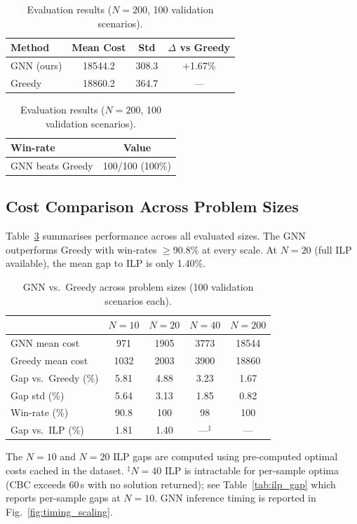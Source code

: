 \documentclass[conference]{IEEEtran}
\begin{document}
\begin{table}[htbp]
\caption{Evaluation results ($N{=}200$, 100 validation scenarios).}
\label{tab:results_200obj}
\centering
\begin{tabular}{@{}lccc@{}}
\toprule
\textbf{Method} & \textbf{Mean Cost} & \textbf{Std} & \textbf{$\Delta$ vs Greedy} \\
\midrule
GNN (ours) & 18544.2 & 308.3 & +1.67\% \\
Greedy & 18860.2 & 364.7 & \multicolumn{1}{c}{---} \\
\bottomrule
\end{tabular}

\vspace{2mm}
\begin{tabular}{@{}lc@{}}
\toprule
\textbf{Win-rate} & \textbf{Value} \\
\midrule
GNN beats Greedy & 100/100 (100\%) \\
\bottomrule
\end{tabular}
\end{table}

\subsection{Cost Comparison Across Problem Sizes}

Table~\ref{tab:cross_size} summarises performance across all evaluated sizes. The GNN outperforms Greedy with win-rates $\geq$90.8\% at every scale. At $N{=}20$ (full ILP available), the mean gap to ILP is only 1.40\%.

\begin{table}[htbp]
\caption{GNN vs.\ Greedy across problem sizes (100 validation scenarios each).}
\label{tab:cross_size}
\centering
\begin{tabular}{@{}lcccc@{}}
\toprule
& $N{=}10$ & $N{=}20$ & $N{=}40$ & $N{=}200$ \\ 
\midrule
GNN mean cost        & 971   & 1905  & 3773  & 18544 \\
Greedy mean cost     & 1032  & 2003  & 3900  & 18860 \\
Gap vs.\ Greedy (\%)     & 5.81  & 4.88  & 3.23  & 1.67 \\
Gap std (\%)         & 5.64  & 3.13  & 1.85  & 0.82 \\
Win-rate (\%)        & 90.8    & 100   & 98    & 100 \\
Gap vs.\ ILP (\%)   & 1.81  & 1.40  & ---$^{\ddag}$ & --- \\
\bottomrule
\end{tabular}
\vspace{1mm}

\footnotesize The $N{=}10$ and $N{=}20$ ILP gaps are computed using pre-computed optimal costs cached in the dataset. $^{\ddag}$$N{=}40$ ILP is intractable for per-sample optima (CBC exceeds 60\,s with no solution returned); see Table~\ref{tab:ilp_gap} which reports per-sample gaps at $N{=}10$. GNN inference timing is reported in Fig.~\ref{fig:timing_scaling}.
\end{table}
\end{document}

